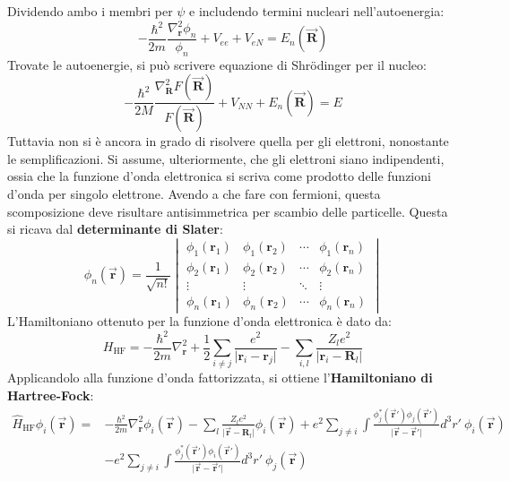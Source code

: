 \documentclass[10pt, a4paper]{scrartcl}
\numberwithin{equation}{subsection}
\theoremstyle{style1}
\begin{document}
Dividendo ambo i membri per $\psi $ e includendo termini nucleari nell'autoenergia:
\begin{equation}
-\frac{\hbar ^2}{2m}\frac{\nabla ^2 _\mathbf{r} \phi _n}{\phi _n} + V_{ee}  + V_{eN} = E_n(\vec{\mathbf{R} })
\end{equation}
Trovate le autoenergie, si pu\`o scrivere equazione di Shr\"odinger per il nucleo:
\begin{equation}
	-\frac{\hbar ^2}{2M} \frac{\nabla ^2 _\mathbf{R} F(\vec{\mathbf{R} })}{F(\vec{\mathbf{R} })} + V_{N N } + E_n(\vec{\mathbf{R} }) = E
\end{equation}
Tuttavia non si è ancora in grado di risolvere quella per gli elettroni, nonostante le semplificazioni.
Si assume, ulteriormente, che gli elettroni siano indipendenti, ossia che la funzione d'onda elettronica si scriva come prodotto delle funzioni d'onda per singolo elettrone.
Avendo a che fare con fermioni, questa scomposizione deve risultare antisimmetrica per scambio delle particelle. 
Questa si ricava dal \textbf{determinante di Slater}:
\begin{equation}
	\phi _n (\vec{\mathbf{r} }) = \frac{1}{\sqrt{n!} } \begin{vmatrix} \phi _1(\mathbf{r} _1) & \phi _1(\mathbf{r} _2) & \cdots & \phi _1 (\mathbf{r} _n) \\ 
	\phi_2 (\mathbf{r}_1 )& \phi _2 ( \mathbf{r} _2) & \cdots & \phi _2 (\mathbf{r} _n)\\
	\vdots & \vdots& \ddots & \vdots\\
\phi _n (\mathbf{r} _1) & \phi _n (\mathbf{r} _2) & \cdots &\phi _n(\mathbf{r} _n)\end{vmatrix} 
\end{equation}
L'Hamiltoniano ottenuto per la funzione d'onda elettronica \`e dato da:
\begin{equation}
	H_\text{HF} = -\frac{\hbar^2}{2m} \nabla ^2_\mathbf{r}  + \frac{1}{2}\sum_{i\neq j}^{} \frac{e^2}{\lvert \mathbf{r} _i - \mathbf{r} _j \rvert } - \sum_{i,l}^{} \frac{Z_l e^2}{\lvert \mathbf{r} _i - \mathbf{R} _l \rvert }
\end{equation}
Applicandolo alla funzione d'onda fattorizzata, si ottiene l'\textbf{Hamiltoniano di Hartree-Fock}:
\begin{equation}
	\begin{split}
		\hat{H}_\text{HF} \phi _i (\vec{\mathbf{r} } ) = &- \frac{\hbar ^2}{2m} \nabla _\mathbf{r} ^2 \phi _i(\vec{\mathbf{r} })-\sum_{l}^{} \frac{Z_l e^2}{\lvert \vec{\mathbf{r} } - \mathbf{R} _l \rvert } \phi _i (\vec{\mathbf{r} }) + e^2 \sum_{j\neq i }^{} \int \frac{\phi _j^*(\vec{\mathbf{r} }') \phi _j(\vec{\mathbf{r} }')}{\lvert \vec{\mathbf{r} }-\vec{\mathbf{r} }' \rvert } d^3 r' \ \phi _i (\vec{\mathbf{r} })\\
							   &-e^2 \sum_{j\neq i}^{} \int \frac{\phi _j^*(\vec{\mathbf{r} }') \phi _i (\vec{\mathbf{r} }')}{\lvert \vec{\mathbf{r} }- \vec{\mathbf{r} }' \rvert } d^3 r' \ \phi _j (\vec{\mathbf{r} })
	\end{split}
\end{equation}
\end{document}
